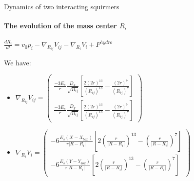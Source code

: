 \documentclass{beamer}
\begin{document}
\begin{frame}{Dynamics of two interacting squirmers}
    \framesubtitle{The evolution of the mass center $R_i$}
    \begin{center}
        \(\boxed{\frac{dR_i}{dt} = v_0 p_i -  \nabla_{R_{ij}} V_{ij} - \nabla_{R_i} V_i + F^{hydro}}\)
    \end{center}
    We have: 
    \begin{itemize}
        \item \(\nabla_{R_{ij}} V_{ij} = 
        \begin{pmatrix}
            \frac{-3 E_s}{r} \frac{D_x}{\sqrt{R_{ij}}}\left[ \frac{2(2r)^{13}}{(R_{ij})^{13}} - \frac{(2r)^7}{(R_{ij})^7} \right] \\
            \frac{-3 E_s}{r} \frac{D_y}{\sqrt{R_{ij}}}\left[ \frac{2(2r)^{13}}{(R_{ij})^{13}} - \frac{(2r)^7}{(R_{ij})^7} \right]
        \end{pmatrix}\)
        \item \(\nabla_{R_i} V_i = 
        \begin{pmatrix}
            -6 \frac{E_s (X-X_{box})}{r \lvert R - R_i \rvert } \left[ 2 \left( \frac{r}{\lvert R-R_i\rvert} \right)^{13} - \left( \frac{r}{\lvert R-R_i\rvert}\right)^7 \right] \\
            -6 \frac{E_s (Y-Y_{box})}{r \lvert R - R_i \rvert } \left[ 2 \left( \frac{r}{\lvert R-R_i\rvert} \right)^{13} - \left( \frac{r}{\lvert R-R_i\rvert}\right)^7 \right]
        \end{pmatrix}\)
    \end{itemize}
    \end{frame}
    
\end{document}
